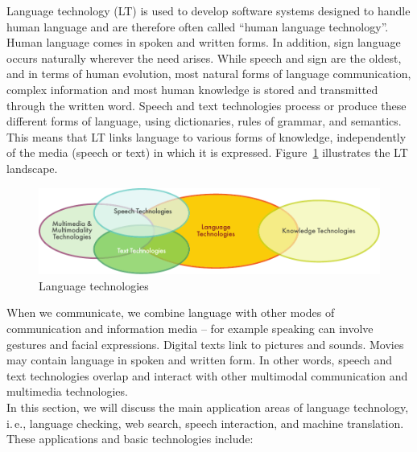 \clearpage


\begin{multicols}{2}

Language technology (LT) is used to develop software systems designed
to handle human language and are therefore often called ``human
language technology''. Human language comes in spoken and written
forms. In addition, sign language occurs naturally wherever the
need arises. While speech and sign are the oldest, and in terms of
human evolution, most natural forms of language communication,
complex information and most human knowledge is stored and transmitted
through the written word. Speech and text technologies process or
produce these different forms of language, using dictionaries, rules
of grammar, and semantics. This means that LT links
language to various forms of knowledge, independently of the media
(speech or text) in which it is
expressed. Figure~\ref{fig:ltincontext_en} illustrates the LT
landscape.

\begin{figure}[htb]
  \center
  \includegraphics[width=\textwidth]{../_media/english/language_technologies}
  \caption{Language technologies}
  \label{fig:ltincontext_en}
\end{figure}

When we communicate, we combine language with other modes of communication and information media -- for example speaking can involve gestures and facial expressions. Digital texts link to pictures and sounds. Movies may contain language in spoken and written form. In other words, speech and text technologies overlap and interact with other multimodal communication and multimedia technologies.\\ 
In this section, we will discuss the main application areas of language technology, i.\,e., language checking, web search, speech interaction, and machine translation. These applications and basic technologies include: 


\end{multicols}
